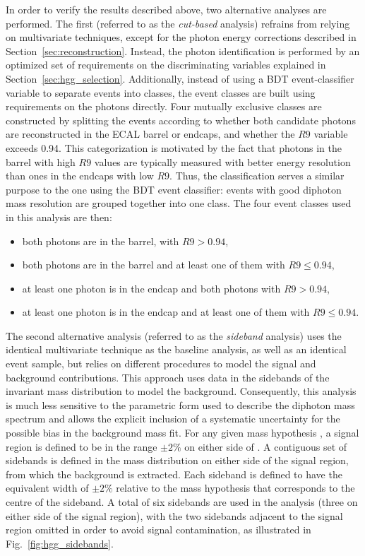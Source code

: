 \documentclass[11pt,twoside,a4paper,cmspaper,final,collab]{cms-tdr}
\begin{document}
In order to verify the results described above, two alternative analyses are performed.
The first (referred to as the {\it cut-based} analysis) refrains from relying on multivariate
techniques, except for the photon energy corrections described in Section~\ref{sec:reconstruction}.
Instead, the photon identification is performed by an optimized set of requirements on the
discriminating variables explained in Section~\ref{sec:hgg_selection}. Additionally, instead of using a BDT
event-classifier variable to separate events into classes, the event classes are built using requirements
on the photons directly. Four mutually exclusive classes are constructed by splitting the events according
to whether  both candidate photons are reconstructed in the ECAL barrel
or endcaps, and  whether the  $R9$ variable exceeds 0.94.
This categorization is motivated by the fact that photons in the barrel with high $R9$ values
are typically measured with better energy resolution than ones in the endcaps  with low $R9$.
Thus, the classification serves a similar purpose to the one
using the BDT event classifier: events with good diphoton mass resolution are grouped together into one class.
The four event classes used in this analysis are then:
\begin{itemize}
\item both photons are in the barrel, with $R9>0.94$,
\item both photons are in the barrel and at least one of them with $R9\leq0.94$,
\item at least one photon is in the endcap and both photons with $R9>0.94$,
\item at least one photon is in the endcap and at least one of them with $R9\leq0.94$.
\end{itemize}
The second alternative analysis (referred to as the {\it sideband} analysis)
uses the identical multivariate technique as the baseline analysis, as well as
an identical event sample, but relies on different procedures to model the signal and background contributions.
This approach uses data in the sidebands of the invariant mass distribution to model the background.
Consequently, this analysis is much less sensitive to the parametric form used to describe the diphoton
mass spectrum and allows the explicit inclusion of a systematic uncertainty for the possible bias in the
background mass fit.
For any given mass hypothesis \mH, a signal region is defined to be in
the range ${\pm}2\%$
on either side of \mH.
A contiguous set of sidebands is defined in the mass distribution on either side of the signal region, from
which the background is extracted.
Each sideband is defined to have the equivalent width of ${\pm}2\%$ relative to the mass hypothesis
that corresponds to the centre of the sideband.  A total of six sidebands are used in the analysis
(three on either side of the signal region), with the two sidebands adjacent to the
signal region omitted in order to avoid signal contamination, as
illustrated in Fig.~\ref{fig:hgg_sidebands}.
\end{document}
